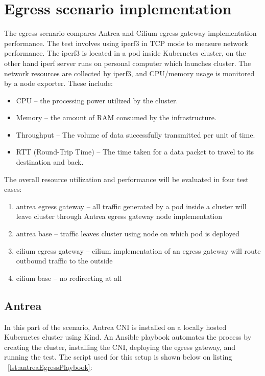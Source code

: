 

\section{Egress scenario implementation}
\label{sec:egressImpl}


The egress scenario compares Antrea and Cilium egress gateway implementation performance. The test involves using iperf3 in TCP mode to measure network performance. The iperf3 is located in a pod inside Kubernetes cluster, on the other hand iperf server runs on personal computer which launches cluster. The network resources are collected by iperf3, and CPU/memory usage is monitored by a node exporter. These include:
\begin{itemize}
  \item CPU -- the processing power utilized by the cluster.
  \item Memory -- the amount of RAM consumed by the infrastructure.
  \item Throughput -- The volume of data successfully transmitted per unit of time.
  \item RTT (Round-Trip Time) -- The time taken for a data packet to travel to its destination and back.
\end{itemize}

The overall resource utilization and performance will be evaluated in four test cases:

\begin{enumerate}
  \item antrea egress gateway -- all traffic generated by a pod inside a cluster will leave cluster through Antrea egress gateway node implementation
  \item antrea base -- traffic leaves cluster using node on which pod is deployed
  \item cilium egress gateway -- cilium implementation of an egress gateway will route outbound traffic to the outside
  \item cilium base -- no redirecting at all
\end{enumerate}

\subsection{Antrea}
\label{sec:antreaEgress}

In this part of the scenario, Antrea CNI is installed on a locally hosted Kubernetes cluster using Kind. An Ansible playbook automates the process by creating the cluster, installing the CNI, deploying the egress gateway, and running the test. The script used for this setup is shown below on listing ~\ref{lst:antreaEgressPlaybook}:

